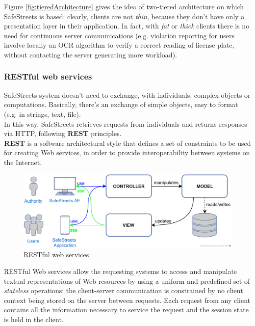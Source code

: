 \documentclass{article}
\begin{document}
				Figure \ref{fig:tieredArchitecture} gives the idea of two-tiered architecture on which SafeStreets is based: clearly, clients are not \textit{thin}, because they don't have only a presentation layer in their application.
				In fact, with \textit{fat} or \textit{thick} clients there is no need for continuous server communications (e.g. violation reporting for users involve locally an OCR algorithm to verify a correct reading of license plate, without contacting the server generating more workload).
			
			\subsubsection{RESTful web services}
				SafeStreets system doesn't need to exchange, with individuals, complex objects or computations. Basically, there's an exchange of simple objects, easy to format (e.g. in strings, text, file).\\
				In this way, SafeStreets retrieves requests from individuals and returns responses via HTTP, following \textbf{REST} principles.\\
				\textbf{REST} is a software architectural style that defines a set of constraints to be used for creating Web services, in order to provide interoperability between systems on the Internet. 
				
				\begin{figure}[H]
					\centering
					\includegraphics[width=1\textwidth]{diagrams/REST.png}
					\caption[RESTful web services]{RESTful web services}
					\label{fig:RESTful web services}
				\end{figure}

				
				RESTful Web services allow the requesting systems to access and manipulate textual representations of Web resources by using a uniform and predefined set of \textit{stateless} operations: the client-server communication is constrained by no client context being stored on the server between requests. Each request from any client contains all the information necessary to service the request and the session state is held in the client.\\
				
\end{document}
